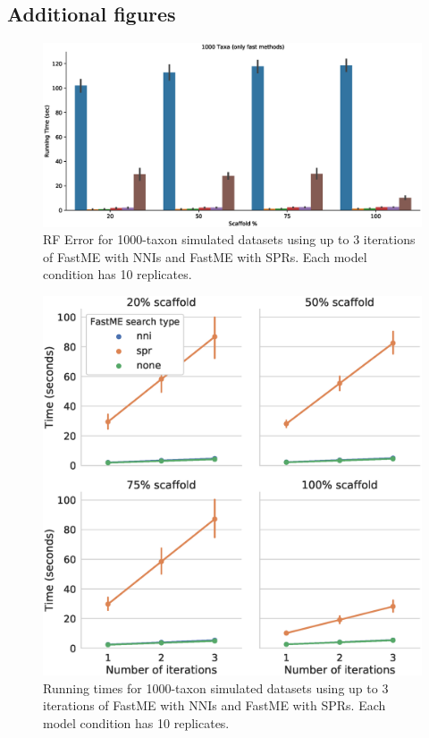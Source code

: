   \subsection{Additional figures}
\begin{figure}
    \centering
    \includegraphics[width=\textwidth]{astrid-missing-figs/running-times-fast.eps}
    \caption{RF Error for 1000-taxon simulated datasets using up to 3 iterations of FastME with NNIs and FastME with SPRs. Each model condition has 10 replicates.}
    \label{astrid-missing::fig:iterations-err}
\end{figure}


\begin{figure}
    \centering
    \includegraphics[width=\textwidth]{astrid-missing-figs/iterations-times.eps}
    \caption{Running times for 1000-taxon simulated datasets using up to 3 iterations of FastME with NNIs and FastME with SPRs. Each model condition has 10 replicates.}
    \label{astrid-missing::fig:iterations-times}
\end{figure}